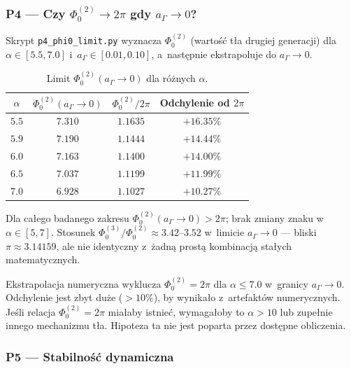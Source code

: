 \subsubsection*{P4 — Czy $\Phi_0^{(2)} \to 2\pi$ gdy $a_\Gamma \to 0$?}

Skrypt \texttt{p4\_phi0\_limit.py} wyznacza $\Phi_0^{(2)}$ (wartość tła
drugiej generacji) dla $\alpha \in [5.5, 7.0]$ i~$a_\Gamma \in [0.01, 0.10]$,
a~następnie ekstrapoluje do $a_\Gamma \to 0$.

\begin{table}[h]
\centering\small
\caption{Limit $\Phi_0^{(2)}(a_\Gamma \to 0)$ dla różnych $\alpha$.}
\label{tab:p4-phi0}
\begin{tabular}{@{}cccc@{}}
\toprule
$\alpha$ & $\Phi_0^{(2)}(a_\Gamma\to 0)$ & $\Phi_0^{(2)} / 2\pi$ & Odchylenie od $2\pi$ \\
\midrule
$5.5$ & $7.310$ & $1.1635$ & $+16.35\%$ \\
$5.9$ & $7.190$ & $1.1444$ & $+14.44\%$ \\
$6.0$ & $7.163$ & $1.1400$ & $+14.00\%$ \\
$6.5$ & $7.037$ & $1.1199$ & $+11.99\%$ \\
$7.0$ & $6.928$ & $1.1027$ & $+10.27\%$ \\
\bottomrule
\end{tabular}
\end{table}

Dla całego badanego zakresu $\Phi_0^{(2)}(a_\Gamma \to 0) > 2\pi$;
brak zmiany znaku w~$\alpha \in [5, 7]$.
Stosunek $\Phi_0^{(3)}/\Phi_0^{(2)} \approx 3.42\text{--}3.52$
w~limicie $a_\Gamma \to 0$ — bliski $\pi \approx 3.14159$,
ale nie identyczny z~żadną prostą kombinacją stałych matematycznych.

\begin{result}%
\label{res:p4}
Ekstrapolacja numeryczna wyklucza $\Phi_0^{(2)} = 2\pi$ dla
$\alpha \leq 7.0$ w~granicy $a_\Gamma \to 0$.
Odchylenie jest zbyt duże ($>10\%$), by wynikało z~artefaktów numerycznych.
Jeśli relacja $\Phi_0^{(2)} = 2\pi$ miałaby istnieć,
wymagałoby to $\alpha > 10$ lub zupełnie innego mechanizmu tła.
Hipoteza ta nie jest poparta przez dostępne obliczenia.
\end{result}

\subsubsection*{P5 — Stabilność dynamiczna}

